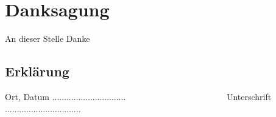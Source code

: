 \documentclass[a4paper,12pt,bibtotocnumbered, twosite]{scrreprt}
\begin{document}



\newpage  

\newpage

\newpage

\newpage

\newpage

\newpage\newpage

\listoffigures
\listoftables







\chapter*{Danksagung}

An dieser Stelle Danke 
\newpage
\section*{Erklärung}

Ort, Datum ............................... \ \ \ \ \ \ \ \ \ \ \ \ \ \ \ \ \ \ \ \ \ \ \ 
Unterschrift ................................
 
\end{document}

